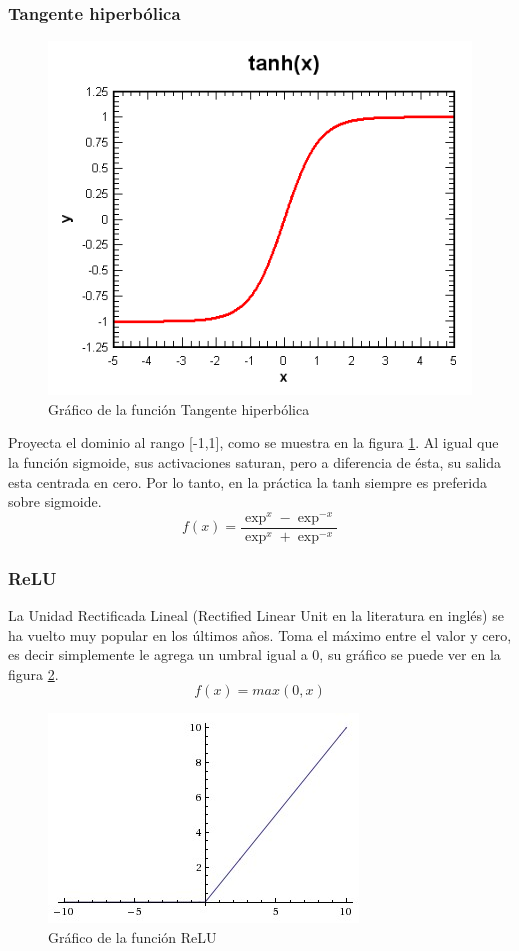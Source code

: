 \documentclass[a4paper,11pt,spanish]{book}
\begin{document}
	  \subsubsection {Tangente hiperbólica}
	    \begin{figure}[ht]
	      \begin{center}
	       \includegraphics[width=0.4\linewidth]{./img/tanh.png}
	      \end{center}
	      \caption{Gráfico de la función Tangente hiperbólica}
	      \label{fig:tanh}
	    \end{figure}
	    Proyecta el dominio al rango [-1,1], como se muestra en la figura \ref{fig:tanh}. Al igual que la función sigmoide, sus activaciones saturan, pero a diferencia
	    de ésta, su salida esta centrada en cero. Por lo tanto, en la práctica la tanh siempre es preferida sobre sigmoide.
	    \begin{equation*}
	     f(x) = \frac{\exp^x - \exp^{-x}}{\exp^x + \exp^{-x}}
	    \end{equation*}

	  \subsubsection {ReLU}
	    La Unidad Rectificada Lineal (Rectified Linear Unit en la literatura en inglés) se ha vuelto muy popular en los últimos años. 
	    Toma el máximo entre el valor y cero, es decir simplemente le agrega un umbral igual a 0, su gráfico se puede ver en la figura \ref{fig:relu}.
	    \begin{equation}
	     f(x) = max(0,x)
	    \end{equation}
	    \begin{figure}[ht]
	      \begin{center}
	       \includegraphics[width=0.4\linewidth]{./img/relu.jpeg}
	      \end{center}
	      \caption{Gráfico de la función ReLU}
	      \label{fig:relu}
	    \end{figure}
\end{document}
